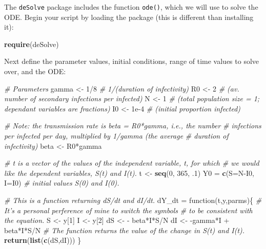 \documentclass[]{book}
\newenvironment{Shaded}{\begin{snugshade}}{\end{snugshade}}
\newcommand{\KeywordTok}[1]{\textcolor[rgb]{0.13,0.29,0.53}{\textbf{{#1}}}}
\newcommand{\DataTypeTok}[1]{\textcolor[rgb]{0.13,0.29,0.53}{{#1}}}
\newcommand{\DecValTok}[1]{\textcolor[rgb]{0.00,0.00,0.81}{{#1}}}
\newcommand{\FloatTok}[1]{\textcolor[rgb]{0.00,0.00,0.81}{{#1}}}
\newcommand{\StringTok}[1]{\textcolor[rgb]{0.31,0.60,0.02}{{#1}}}
\newcommand{\CommentTok}[1]{\textcolor[rgb]{0.56,0.35,0.01}{\textit{{#1}}}}
\newcommand{\NormalTok}[1]{{#1}}
\begin{document}
The \texttt{deSolve} package includes the function \texttt{ode()}, which
we will use to solve the ODE. Begin your script by loading the package
(this is different than installing it):

\begin{Shaded}
\begin{Highlighting}[]
\KeywordTok{require}\NormalTok{(deSolve)}
\end{Highlighting}
\end{Shaded}

Next define the parameter values, initial conditions, range of time
values to solve over, and the ODE:

\begin{Shaded}
\begin{Highlighting}[]
\CommentTok{# Parameters}
\NormalTok{gamma <-}\StringTok{ }\DecValTok{1}\NormalTok{/}\DecValTok{8} \CommentTok{# 1/(duration of infectivity)}
\NormalTok{R0 <-}\StringTok{ }\DecValTok{2} \CommentTok{# (av. number of secondary infections per infected)}
\NormalTok{N <-}\StringTok{ }\DecValTok{1} \CommentTok{# (total population size = 1; dependant variables are fractions)}
\NormalTok{I0 <-}\StringTok{ }\FloatTok{1e-4} \CommentTok{# (initial proportion infected)}

\CommentTok{# Note: the transmission rate is beta = R0*gamma, i.e., the number}
\CommentTok{# infections per infected per day, multiplied by 1/gamma (the average}
\CommentTok{# duration of infectivity)}
\NormalTok{beta <-}\StringTok{ }\NormalTok{R0*gamma}

\CommentTok{# t is a vector of the values of the independent variable, t, for which}
\CommentTok{# we would like the dependent variables, S(t) and I(t).}
\NormalTok{t <-}\StringTok{ }\KeywordTok{seq}\NormalTok{(}\DecValTok{0}\NormalTok{, }\DecValTok{365}\NormalTok{, .}\DecValTok{1}\NormalTok{) }
\NormalTok{Y0 =}\StringTok{ }\KeywordTok{c}\NormalTok{(}\DataTypeTok{S=}\NormalTok{N-I0, }\DataTypeTok{I=}\NormalTok{I0) }\CommentTok{# initial values S(0) and I(0).}

\CommentTok{# This is a function returning dS/dt and dI/dt.}
\NormalTok{dY_dt =}\StringTok{ }\NormalTok{function(t,y,parms)\{}
  \CommentTok{# It's a personal perference of mine to switch the symbols}
  \CommentTok{# to be consistent with the equation.}
  \NormalTok{S <-}\StringTok{ }\NormalTok{y[}\DecValTok{1}\NormalTok{]}
  \NormalTok{I <-}\StringTok{ }\NormalTok{y[}\DecValTok{2}\NormalTok{]}
 \NormalTok{dS <-}\StringTok{ }\NormalTok{-}\StringTok{ }\NormalTok{beta*I*S/N}
 \NormalTok{dI <-}\StringTok{ }\NormalTok{-gamma*I +}\StringTok{ }\NormalTok{beta*I*S/N }
  \CommentTok{# The function returns the value of the change in S(t) and I(t).}
\KeywordTok{return}\NormalTok{(}\KeywordTok{list}\NormalTok{(}\KeywordTok{c}\NormalTok{(dS,dI)))}
\NormalTok{\}}
\end{Highlighting}
\end{Shaded}
\end{document}
